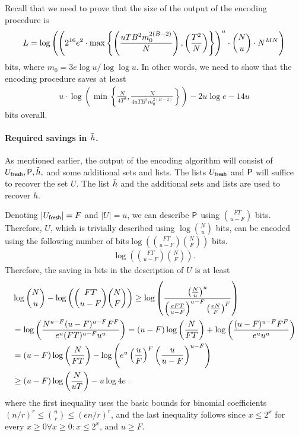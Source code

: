 Recall that we need to prove that the size of the output of the encoding procedure is \[L=\log \left({\left({2^{16}} e^2\cdot \max\left\{\left(\frac{uTB^2m_0^{2(B-2)}}{N}\right),\left(\frac{T^2}{N}\right)\right\}\right)}^u \cdot \binom {N}{u}\cdot N^{MN}\right)\] bits, where $m_0 = 3e \log u / \log\log u$.
In other words, we need to show that the encoding procedure saves at least 
\begin{align}
  u\cdot\log\left( \min\left\{\frac{N}{4T^2},\frac{N}{4uTB^2m_0^{2(B-2)}}\right\}\right) -2u\log e -14u
  \label{eq:requiredSavings}
\end{align}
bits overall.

\paragraph{Required savings in $\tilde{h}$.} As mentioned earlier, the output of the encoding algorithm will consist of $U_\textsf{fresh},\mathsf{P}, \tilde{h},$ and some additional sets and lists. The lists $U_\textsf{fresh}$ and $\mathsf{P}$ will suffice to recover the set $U$. The list $\tilde{h}$ and the additional sets and lists are used to recover $h$. 

Denoting $|U_\textsf{fresh}|=F$ and $|U|=u$, we can describe $\mathsf{P}$ using $\binom{FT}{u-F}$ bits. Therefore, $U$, which is trivially described using $\log \binom{N}{u}$ bits, can be encoded using \ifnum{} the following number of bits\else $\log \left(\binom{FT}{u-F}\binom{N}{F}\right)$ bits.\fi
\ifnum{}
\begin{align*}
\log \left(\binom{FT}{u-F}\binom{N}{F}\right).
\end{align*}  
\fi
 Therefore, the saving in bits in the description of $U$ is at least
\begin{align}
&\log \binom{N}{u} - \log \left(\binom{FT}{u-F}\binom{N}{F}\right)  \ge \log \left(\frac{\left(\frac{N}{u}\right)^u}{\left(\frac{eFT}{u-F}\right)^{u-F}\left(\frac{eN}{F}\right)^F} \right) \nonumber \\
\ifnum\eprintversion=1
 & =  \log \left(\frac{N^{u-F}(u-F)^{u-F}F^F}{e^u (FT)^{u-F}u^u}\right)= (u-F)\log \left(\frac{N}{FT}\right)+\log \left(  \frac{(u-F)^{u-F}F^F}{e^u u^u} \right)\nonumber \\
 \fi
 & = (u-F)\log \left(\frac{N}{FT}\right)-\log \left(e^u \left(\frac{u}{F}\right)^F\left(\frac{u}{u-F}\right)^{u-F}\right) \nonumber \\
 &  \geq (u-F)\log \left(\frac{N}{uT}\right)-u\log 4e\;. \label{eq:savingU}
\end{align}
where the first inequality uses the basic bounds for binomial coefficients $(n/r)^r\leq \binom{n}{r}\leq (en/r)^r$, and the last inequality follows since  \ifnum{} $x \le 2^x$ for every $x\ge 0$\else $\forall x\ge 0\colon x \le 2^x$\fi, and $u\geq F$.

